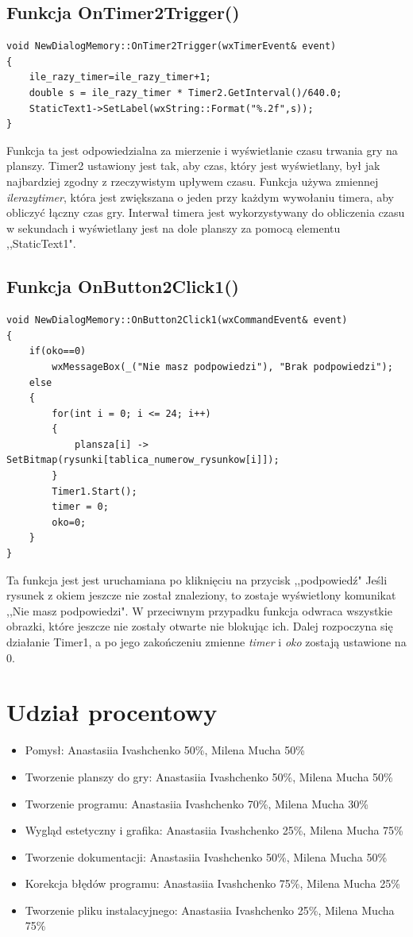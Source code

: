\documentclass[a4paper]{article}
\begin{document}
 \subsection{Funkcja OnTimer2Trigger()}
\begin{verbatim}
void NewDialogMemory::OnTimer2Trigger(wxTimerEvent& event)
{
    ile_razy_timer=ile_razy_timer+1;
    double s = ile_razy_timer * Timer2.GetInterval()/640.0;
    StaticText1->SetLabel(wxString::Format("%.2f",s));
}
\end{verbatim}
Funkcja ta jest odpowiedzialna za mierzenie i wyświetlanie czasu trwania gry na planszy.
Timer2 ustawiony jest tak, aby czas, który jest wyświetlany, był jak najbardziej zgodny z rzeczywistym upływem czasu.
Funkcja używa zmiennej \emph{ile\textunderscore razy\textunderscore timer}, która jest zwiększana o jeden przy każdym wywołaniu timera, aby obliczyć łączny czas gry. Interwał timera jest wykorzystywany do obliczenia czasu w sekundach i wyświetlany jest na dole planszy za pomocą elementu ,,StaticText1".
\subsection{Funkcja OnButton2Click1()}
\begin{verbatim}
void NewDialogMemory::OnButton2Click1(wxCommandEvent& event)
{
    if(oko==0)
        wxMessageBox(_("Nie masz podpowiedzi"), "Brak podpowiedzi");
    else
    {
        for(int i = 0; i <= 24; i++)
        {
            plansza[i] -> SetBitmap(rysunki[tablica_numerow_rysunkow[i]]);
        }
        Timer1.Start();
        timer = 0;
        oko=0;
    }
}
\end{verbatim}
Ta funkcja jest jest uruchamiana po kliknięciu na przycisk ,,podpowiedź"
Jeśli rysunek z okiem jeszcze nie został znaleziony, to zostaje wyświetlony komunikat ,,Nie masz podpowiedzi". W przeciwnym przypadku funkcja odwraca wszystkie obrazki, które jeszcze nie zostały otwarte nie blokując ich. Dalej rozpoczyna się działanie Timer1, a po jego zakończeniu zmienne \emph{timer} i \emph{oko} zostają ustawione na 0. 
\section{Udział procentowy}
\begin{itemize}
    \item Pomysł: Anastasiia Ivashchenko 50\%, Milena Mucha 50\%
    \item Tworzenie planszy do gry: Anastasiia Ivashchenko 50\%, Milena Mucha 50\%
    \item Tworzenie programu: Anastasiia Ivashchenko 70\%, Milena Mucha 30\%
    \item Wygląd estetyczny i grafika: Anastasiia Ivashchenko 25\%, Milena Mucha 75\%
    \item Tworzenie dokumentacji: Anastasiia Ivashchenko 50\%, Milena Mucha 50\%
    \item Korekcja błędów programu: Anastasiia Ivashchenko 75\%, Milena Mucha 25\%
    \item Tworzenie pliku instalacyjnego: Anastasiia Ivashchenko 25\%, Milena Mucha 75\%
\end{itemize}
\end{document}
